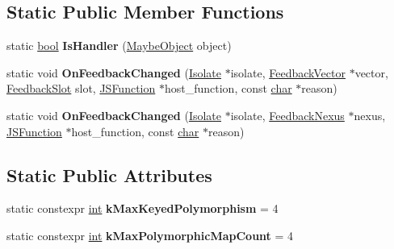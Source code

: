 \subsection*{Static Public Member Functions}
\begin{DoxyCompactItemize}
\item 
\mbox{\label{classv8_1_1internal_1_1IC_a6a3e67ca6cb128b56a45f172c3722f15}} 
static \mbox{\hyperlink{classbool}{bool}} {\bfseries Is\+Handler} (\mbox{\hyperlink{classv8_1_1internal_1_1MaybeObject}{Maybe\+Object}} object)
\item 
\mbox{\label{classv8_1_1internal_1_1IC_a08bfbe6979fcf7b336fcdfb61ab0e64b}} 
static void {\bfseries On\+Feedback\+Changed} (\mbox{\hyperlink{classv8_1_1internal_1_1Isolate}{Isolate}} $\ast$isolate, \mbox{\hyperlink{classv8_1_1internal_1_1FeedbackVector}{Feedback\+Vector}} $\ast$vector, \mbox{\hyperlink{classv8_1_1internal_1_1FeedbackSlot}{Feedback\+Slot}} slot, \mbox{\hyperlink{classv8_1_1internal_1_1JSFunction}{J\+S\+Function}} $\ast$host\+\_\+function, const \mbox{\hyperlink{classchar}{char}} $\ast$reason)
\item 
\mbox{\label{classv8_1_1internal_1_1IC_a4223490a1d2ede4ea2dd62fbe131795a}} 
static void {\bfseries On\+Feedback\+Changed} (\mbox{\hyperlink{classv8_1_1internal_1_1Isolate}{Isolate}} $\ast$isolate, \mbox{\hyperlink{classv8_1_1internal_1_1FeedbackNexus}{Feedback\+Nexus}} $\ast$nexus, \mbox{\hyperlink{classv8_1_1internal_1_1JSFunction}{J\+S\+Function}} $\ast$host\+\_\+function, const \mbox{\hyperlink{classchar}{char}} $\ast$reason)
\end{DoxyCompactItemize}
\subsection*{Static Public Attributes}
\begin{DoxyCompactItemize}
\item 
\mbox{\label{classv8_1_1internal_1_1IC_ae06ba10ed8e62f0be402a1b599d81215}} 
static constexpr \mbox{\hyperlink{classint}{int}} {\bfseries k\+Max\+Keyed\+Polymorphism} = 4
\item 
\mbox{\label{classv8_1_1internal_1_1IC_a0f447dbf28b2f48b243ed2d631de0408}} 
static constexpr \mbox{\hyperlink{classint}{int}} {\bfseries k\+Max\+Polymorphic\+Map\+Count} = 4
\end{DoxyCompactItemize}
